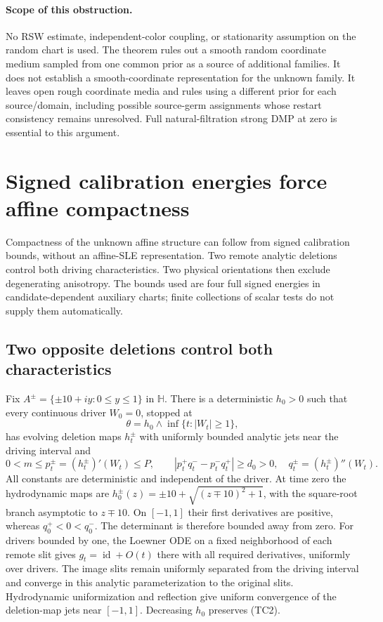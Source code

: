 \documentclass[11pt]{article}
\theoremstyle{definition}\newtheorem{definition}[theorem]{Definition}
\theoremstyle{remark}\newtheorem{remark}[theorem]{Remark}
\begin{document}
\paragraph{Scope of this obstruction.}
No RSW estimate, independent-color coupling, or stationarity assumption
on the random chart is used. The theorem rules out a smooth random
coordinate medium sampled from one common prior as a source of additional
families. It does not establish a smooth-coordinate representation for
the unknown family. It leaves open rough coordinate media and rules
using a different prior for each source/domain, including possible
source-germ assignments whose restart consistency remains unresolved.
Full natural-filtration strong DMP at zero is essential to this argument.



\section{Signed calibration energies force affine compactness}
\label{sec:affine-tensor-coercivity}

Compactness of the unknown affine structure can follow from signed
calibration bounds, without an affine-SLE representation. Two remote
analytic deletions control both driving characteristics. Two physical
orientations then exclude degenerating anisotropy. The bounds used are
four full signed energies in candidate-dependent auxiliary charts;
finite collections of scalar tests do not supply them automatically.

\subsection{Two opposite deletions control both characteristics}

Fix $A^\pm=\{\pm10+iy:0\le y\le1\}$ in $\mathbb H$. There is a
deterministic $h_0>0$ such that every continuous driver $W_0=0$,
stopped at
\[
 \theta=h_0\wedge\inf\{t:|W_t|\ge1\},
 \tag{TC1}
\]
has evolving deletion maps $h_t^\pm$ with uniformly bounded analytic
jets near the driving interval and
\[
 0<m\le p_t^\pm=(h_t^\pm)'(W_t)\le P,\qquad
 |p_t^+q_t^- -p_t^-q_t^+|\ge d_0>0,
 \quad q_t^\pm=(h_t^\pm)''(W_t).
 \tag{TC2}
\]
All constants are deterministic and independent of the driver. At
time zero the hydrodynamic maps are
$h_0^\pm(z)=\pm10+\sqrt{(z\mp10)^2+1}$, with the square-root branch
asymptotic to $z\mp10$. On $[-1,1]$ their first derivatives are
positive, whereas $q_0^+<0<q_0^-$. The determinant is therefore
bounded away from zero. For drivers bounded by one, the Loewner ODE
on a fixed neighborhood of each remote slit gives
$g_t=\operatorname{id}+O(t)$ there with all required derivatives,
uniformly over drivers. The image slits remain uniformly separated
from the driving interval and converge in this analytic
parameterization to the original slits. Hydrodynamic uniformization
and reflection give uniform convergence of the deletion-map jets
near $[-1,1]$. Decreasing $h_0$ preserves (TC2).
\end{document}
